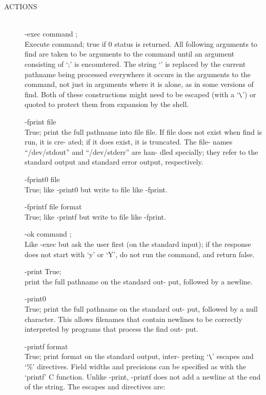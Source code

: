 \begin{description}
\item[ACTIONS] \hfill \\
       -exec command ; \\
              Execute command; true if 0 status is returned.  All
              following arguments to find are taken to  be  arguments
              to  the command until an argument consisting
              of `;' is encountered.  The string `{}' is replaced
              by  the current pathname being processed everywhere
              it occurs in the arguments to the command, not just
              in arguments where it is alone, as in some versions
              of find.  Both of these constructions might need to
              be  escaped  (with a `\verb+\+') or quoted to protect them
              from expansion by the shell.

       -fprint file \\
              True; print the full pathname into file  file.   If
              file  does  not  exist when find is run, it is cre-
              ated; if it does exist, it is truncated.  The file-
              names  ``/dev/stdout'' and ``/dev/stderr'' are han-
              dled specially; they refer to the  standard  output
              and standard error output, respectively.

       -fprint0 file \\
              True;  like -print0 but write to file like -fprint.

       -fprintf file format \\
              True; like -printf but write to file like  -fprint.

       -ok command ; \\
              Like  -exec but ask the user first (on the standard
              input); if the response does not start with `y'  or
              `Y', do not run the command, and return false.

       -print True;   \\
              print the full pathname on the standard out-
              put, followed by a newline.

       -print0 \\
              True; print the full pathname on the standard  out-
              put,  followed  by  a  null character.  This allows
              filenames that contain  newlines  to  be  correctly
              interpreted  by programs that process the find out-
              put.

       -printf format \\
              True; print format on the standard  output,  inter-
              preting  `\verb+\+'  escapes  and  `\%'  directives.  Field
              widths and precisions can be specified as with  the
              `printf'  C  function.  Unlike -print, -printf does
              not add a newline at the end of  the  string.   The
              escapes and directives are:


\end{description}
